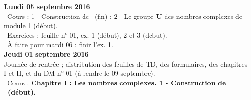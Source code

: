 \documentclass[12pt,a4paper]{article}
\begin{document}
\noindent\textbf{\bf Lundi 05 septembre 2016}\\
\bu\ Cours : 1 - Construction de \C\ (fin) ; 2 - Le groupe \textbf{U} des nombres complexes de 
module 1 (début).\\
\bu\ Exercices : feuille n° 01, ex. 1 (début), 2 et 3 (début).\\
\bu\ À faire pour mardi 06 : finir l'ex. 1.\vspace{.4cm}\\

\noindent\textbf{\bf Jeudi 01 septembre 2016}\\
Journée de rentrée ; distribution des feuilles de TD, des formulaires, des
chapitres I et II, et du DM n° 01 (à rendre le 09 septembre).\\
\bu\ Cours : \bf Chapitre I \rm : Les nombres complexes. 1 - Construction
de \C\ (début).\vspace{.4cm}\\


\label{end}
\end{document}
